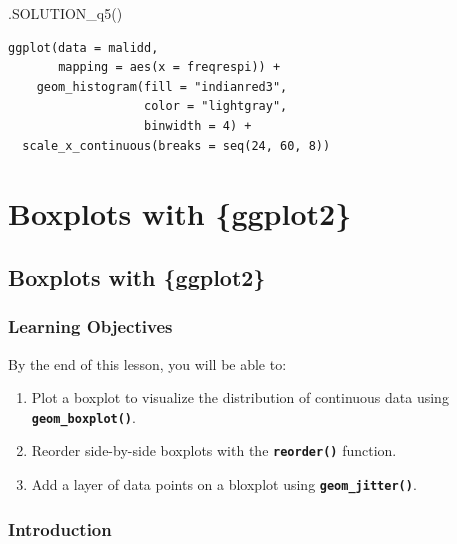 \documentclass[
  letterpaper,
  DIV=11,
  numbers=noendperiod]{scrreprt}
\newenvironment{Shaded}{\begin{snugshade}}{\end{snugshade}}
\newcommand{\FunctionTok}[1]{\textcolor[rgb]{0.28,0.35,0.67}{#1}}
\newcommand{\NormalTok}[1]{\textcolor[rgb]{0.00,0.23,0.31}{#1}}
\providecommand{\tightlist}{%
  \setlength{\itemsep}{0pt}\setlength{\parskip}{0pt}}\usepackage{longtable,booktabs,array}
\begin{document}
\begin{Shaded}
\begin{Highlighting}[]
\FunctionTok{.SOLUTION\_q5}\NormalTok{()}
\end{Highlighting}
\end{Shaded}

\begin{verbatim}
ggplot(data = malidd, 
       mapping = aes(x = freqrespi)) +
    geom_histogram(fill = "indianred3",
                   color = "lightgray", 
                   binwidth = 4) +
  scale_x_continuous(breaks = seq(24, 60, 8))
\end{verbatim}


\hypertarget{boxplots-with-ggplot2}{%
\chapter{Boxplots with \{ggplot2\}}\label{boxplots-with-ggplot2}}

\hypertarget{boxplots-with-ggplot2-1}{%
\section{Boxplots with \{ggplot2\}}\label{boxplots-with-ggplot2-1}}

\hypertarget{learning-objectives-18}{%
\subsection{Learning Objectives}\label{learning-objectives-18}}

By the end of this lesson, you will be able to:

\begin{enumerate}
\def\labelenumi{\arabic{enumi}.}
\tightlist
\item
  Plot a boxplot to visualize the distribution of continuous data using
  \textbf{\texttt{geom\_boxplot()}}.
\item
  Reorder side-by-side boxplots with the \textbf{\texttt{reorder()}}
  function.
\item
  Add a layer of data points on a bloxplot using
  \textbf{\texttt{geom\_jitter()}}.
\end{enumerate}

\hypertarget{introduction-17}{%
\subsection{Introduction}\label{introduction-17}}
\end{document}
